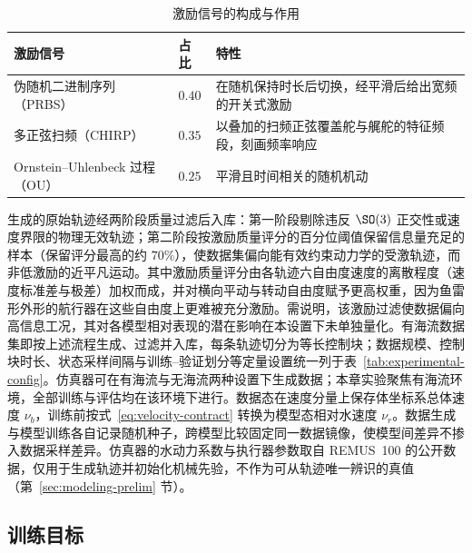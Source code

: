 \begin{table}[htbp]
  \centering
  \caption{激励信号的构成与作用}
  \label{tab:excitation-signals}
  \begin{tabularx}{\textwidth}{>{\raggedright\arraybackslash}p{} >{\centering\arraybackslash}p{} >{\raggedright\arraybackslash}X}
    \toprule
    激励信号 & 占比 & 特性 \\
    \midrule
    伪随机二进制序列（PRBS）& \(0.40\) & 在随机保持时长后切换，经平滑后给出宽频的开关式激励 \\
    多正弦扫频（CHIRP）& \(0.35\) & 以叠加的扫频正弦覆盖舵与艉舵的特征频段，刻画频率响应 \\
    Ornstein--Uhlenbeck 过程（OU）& \(0.25\) & 平滑且时间相关的随机机动 \\
    \bottomrule
  \end{tabularx}
\end{table}

生成的原始轨迹经两阶段质量过滤后入库：第一阶段剔除违反 \(\SO(3)\) 正交性或速度界限的物理无效轨迹；第二阶段按激励质量评分的百分位阈值保留信息量充足的样本（保留评分最高的约 \(70\%\)），使数据集偏向能有效约束动力学的受激轨迹，而非低激励的近平凡运动。其中激励质量评分由各轨迹六自由度速度的离散程度（速度标准差与极差）加权而成，并对横向平动与转动自由度赋予更高权重，因为鱼雷形外形的航行器在这些自由度上更难被充分激励。需说明，该激励过滤使数据偏向高信息工况，其对各模型相对表现的潜在影响在本设置下未单独量化。有海流数据集即按上述流程生成、过滤并入库，每条轨迹切分为等长控制块；数据规模、控制块时长、状态采样间隔与训练--验证划分等定量设置统一列于表~\ref{tab:experimental-config}。仿真器可在有海流与无海流两种设置下生成数据；本章实验聚焦有海流环境，全部训练与评估均在该环境下进行。数据态在速度分量上保存体坐标系总体速度 \(\nu_b\)，训练前按式~\eqref{eq:velocity-contract} 转换为模型态相对水速度 \(\nu_r\)。数据生成与模型训练各自记录随机种子，跨模型比较固定同一数据镜像，使模型间差异不掺入数据采样差异。仿真器的水动力系数与执行器参数取自 REMUS~100 的公开数据，仅用于生成轨迹并初始化机械先验，不作为可从轨迹唯一辨识的真值（第~\ref{sec:modeling-prelim} 节）。

\subsection{训练目标}
\label{subsec:training-objective}

